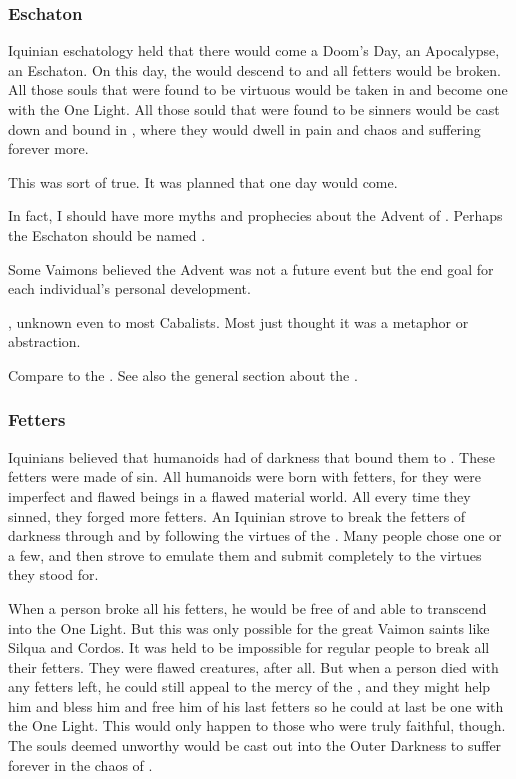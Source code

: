 \subsubsection{Eschaton}
Iquinian eschatology held that there would come a Doom's Day, an Apocalypse, an Eschaton.
On this day, the \sephiroth would descend to \Miith and all fetters would be broken. 
All those souls that were found to be virtuous would be taken in and become one with the One Light.
All those sould that were found to be sinners would be cast down and bound in \itzach, where they would dwell in pain and chaos and suffering forever more. 

This was sort of true. 
It was planned that one day  would come. 

In fact, I should have more myths and prophecies about the Advent of \Lithrim. 
Perhaps the Eschaton should be named .
 
Some Vaimons believed the Advent was not a future event but the end goal for each individual's personal development. 

, unknown even to most Cabalists. 
Most just thought it was a metaphor or abstraction. 

Compare to the . 
See also the general section about the . 





\subsubsection{Fetters}
Iquinians believed that humanoids had  of darkness that bound them to \itzach. 
These fetters were made of sin. 
All humanoids were born with fetters, for they were imperfect and flawed beings in a flawed material world. 
All every time they sinned, they forged more fetters. 
An Iquinian strove to break the fetters of darkness through  and by following the virtues of the \sephiroth. 
Many people chose one \sephirah or a few, and then strove to emulate them and submit completely to the virtues they stood for. 

When a person broke all his fetters, he would be free of \itzach and able to transcend into the One Light. 
But this was only possible for the great Vaimon saints like Silqua and Cordos. 
It was held to be impossible for regular people to break all their fetters. 
They were flawed creatures, after all.
But when a person died with any fetters left, he could still appeal to the mercy of the \sephiroth, and they might help him and bless him and free him of his last fetters so he could at last be one with the One Light. 
This would only happen to those who were truly faithful, though. 
The souls deemed unworthy would be cast out into the Outer Darkness to suffer forever in the chaos of \itzach.






